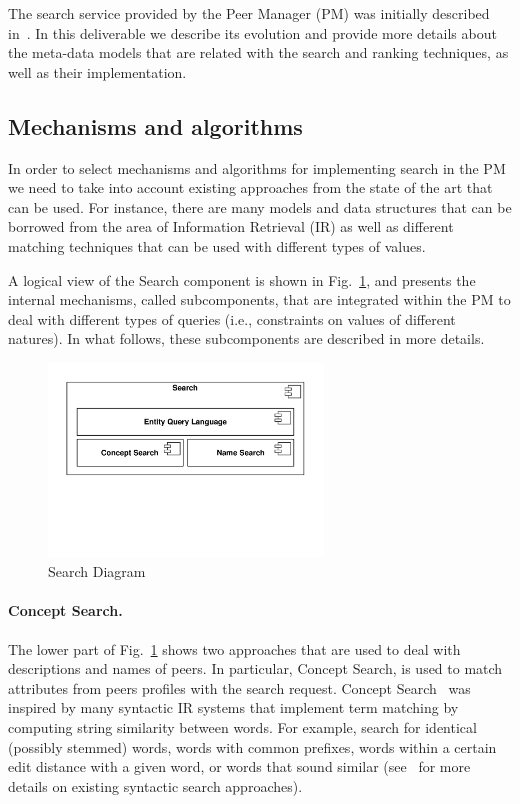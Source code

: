 
The search service provided by the Peer Manager (PM) was initially described in~\cite{D4.2}. In this deliverable we describe its evolution and provide more details about the meta-data models that are related with the search and ranking techniques, as well as their implementation.

\subsection{Mechanisms and algorithms}

In order to select mechanisms and algorithms for implementing search in the PM we need to take into account existing approaches from the state of the art that can be used. For instance, there are many models and data structures that can be borrowed from the area of Information Retrieval (IR) as well as different matching techniques that can be used with different types of values. 

A logical view of the Search component is shown in Fig.~\ref{fig:search_diagram}, and presents the internal mechanisms, called subcomponents, that are integrated within the PM to deal with different types of queries (i.e., constraints on values of different natures). 
In what follows, these subcomponents are described in more details.

\begin{figure}[htbp]
\centering
\includegraphics[width=0.65\textwidth]{figures/SearchComponentDiagram}
\caption{Search Diagram}
\label{fig:search_diagram}
\end{figure}

\paragraph{Concept Search.} 
\label{par:concept_search}
The lower part of Fig.~\ref{fig:search_diagram} shows two approaches that are used to deal with descriptions and names of peers. In particular, Concept Search, is used to match attributes from peers profiles with the search request. Concept Search~\cite{Giunchiglia:2009fk} was inspired by many syntactic IR systems that implement term matching by computing string similarity between words. For example, search for identical (possibly stemmed) words, words with common prefixes, words within a certain edit distance with a given word, or words that sound similar (see~\cite{Manning:2008:IIR:1394399} for more details on existing syntactic search approaches). 

